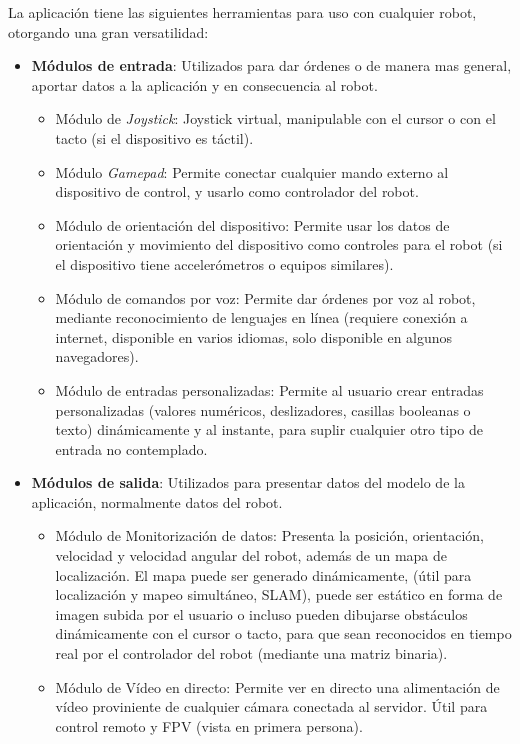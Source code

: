 La aplicación tiene las siguientes herramientas para uso con cualquier robot, otorgando una gran versatilidad:
\begin{itemize}
	\item \textbf{Módulos de entrada}: Utilizados para dar órdenes o de manera mas general, aportar datos a la aplicación y en 
	consecuencia al robot.
		\begin{itemize}
			\item Módulo de \textit{Joystick}: Joystick virtual, manipulable con el cursor o con el tacto (si el dispositivo es 
			táctil).
			\item Módulo \textit{Gamepad}: Permite conectar cualquier mando externo al dispositivo de control, y usarlo como 
			controlador del robot.
			\item Módulo de orientación del dispositivo: Permite usar los datos de orientación y movimiento del dispositivo como 
			controles para el robot (si el dispositivo tiene accelerómetros o equipos similares).
			\item Módulo de comandos por voz: Permite dar órdenes por voz al robot, mediante reconocimiento de lenguajes en línea 
			(requiere conexión a internet, disponible en varios idiomas, solo disponible en algunos navegadores).
			\item Módulo de entradas personalizadas: Permite al usuario crear entradas personalizadas (valores numéricos, 
			deslizadores, casillas booleanas o texto) dinámicamente y al instante, para suplir cualquier otro tipo de entrada no 
			contemplado.
		\end{itemize}
	\item \textbf{Módulos de salida}: Utilizados para presentar datos del modelo de la aplicación, normalmente datos del robot.
		\begin{itemize}
			\item Módulo de Monitorización de datos: Presenta la posición, orientación, velocidad y velocidad angular del robot, 
			además de un mapa de localización. El mapa puede ser generado dinámicamente, (útil para localización y mapeo 
			simultáneo, SLAM), puede ser estático en forma de imagen subida por el usuario o incluso pueden dibujarse obstáculos 
			dinámicamente con el cursor o tacto, para que sean reconocidos en tiempo real por el controlador del robot (mediante 
			una matriz binaria).
			\item Módulo de Vídeo en directo: Permite ver en directo una alimentación de vídeo proviniente de cualquier cámara 
			conectada al servidor. Útil para control remoto y FPV (vista en primera persona).

\end{itemize}
\end{itemize}
